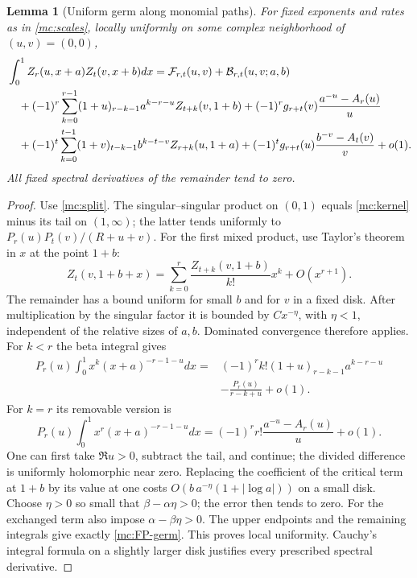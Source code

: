 \documentclass[11pt,a4paper]{article}
\numberwithin{equation}{section}
\newtheorem{lemma}[theorem]{Lemma}
\theoremstyle{definition}
\theoremstyle{remark}
\begin{document}
\begin{lemma}[Uniform germ along monomial paths]\label{mc:uniform-germ}
For fixed exponents and rates as in \eqref{mc:scales}, locally
uniformly on some complex neighborhood of $(u,v)=(0,0)$,
\begin{align}\label{mc:uniform-expansion}
 &\int_0^1 Z_r(u,x+a)Z_t(v,x+b)dx
    =\mathcal F_{r,t}(u,v)+\mathcal B_{r,t}(u,v;a,b)\notag\\
 &\quad+(-1)^r\sum_{k=0}^{r-1}
     (1+u)_{r-k-1}a^{k-r-u}Z_{t+k}(v,1+b)
   +(-1)^r g_{r+t}(v)\frac{a^{-u}-A_r(u)}u\notag\\
 &\quad+(-1)^t\sum_{k=0}^{t-1}
     (1+v)_{t-k-1}b^{k-t-v}Z_{r+k}(u,1+a)
   +(-1)^t g_{r+t}(u)\frac{b^{-v}-A_t(v)}v+o(1).
\end{align}
All fixed spectral derivatives of the remainder tend to zero.
\end{lemma}

\begin{proof}
Use \eqref{mc:split}. The singular--singular product on $(0,1)$
equals \eqref{mc:kernel} minus its tail on $(1,\infty)$; the latter
tends uniformly to $P_r(u)P_t(v)/(R+u+v)$.
For the first mixed product, use Taylor's theorem in $x$ at the
point $1+b$:
\[
 Z_t(v,1+b+x)=\sum_{k=0}^r
          \frac{Z_{t+k}(v,1+b)}{k!}x^k+O(x^{r+1}).
\]
The remainder has a bound uniform for small $b$ and for $v$ in a
fixed disk. After multiplication by the singular factor it is
bounded by $Cx^{-\eta}$, with $\eta<1$, independent of the
relative sizes of $a,b$. Dominated convergence therefore applies.
For $k<r$ the beta integral gives
\begin{align*}
 P_r(u)\int_0^1x^k(x+a)^{-r-1-u}dx
 ={}&(-1)^rk!(1+u)_{r-k-1}a^{k-r-u}\\
 &-\frac{P_r(u)}{r-k+u}+o(1).
\end{align*}
For $k=r$ its removable version is
\[
 P_r(u)\int_0^1x^r(x+a)^{-r-1-u}dx
   =(-1)^rr!\frac{a^{-u}-A_r(u)}u+o(1).
\]
One can first take $\Re u>0$, subtract the tail, and continue;
the divided difference is uniformly holomorphic near zero.
Replacing the coefficient of the critical term at $1+b$ by its
value at one costs $O(b\,a^{-\eta}(1+|\log a|))$ on a small disk.
Choose $\eta>0$ so small that $\beta-\alpha\eta>0$; the error
then tends to zero. For the exchanged term also impose
$\alpha-\beta\eta>0$. The upper endpoints and the remaining
integrals give exactly \eqref{mc:FP-germ}. This proves local
uniformity. Cauchy's integral formula on a slightly larger disk
justifies every prescribed spectral derivative.
\end{proof}
\end{document}
